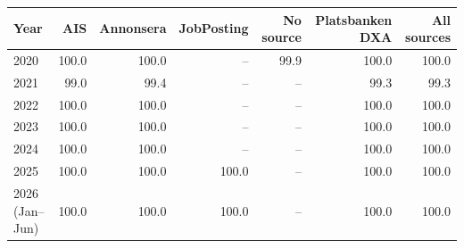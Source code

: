 \scriptsize
\setlength{\tabcolsep}{3.5pt}
\begin{tabular}{lrrrrrr}
\hline\hline
Year & AIS & Annonsera & JobPosting & No source & Platsbanken DXA & All sources \\
\hline
2020 & 100.0 & 100.0 & -- & 99.9 & 100.0 & 100.0 \\
2021 & 99.0 & 99.4 & -- & -- & 99.3 & 99.3 \\
2022 & 100.0 & 100.0 & -- & -- & 100.0 & 100.0 \\
2023 & 100.0 & 100.0 & -- & -- & 100.0 & 100.0 \\
2024 & 100.0 & 100.0 & -- & -- & 100.0 & 100.0 \\
2025 & 100.0 & 100.0 & 100.0 & -- & 100.0 & 100.0 \\
2026 (Jan--Jun) & 100.0 & 100.0 & 100.0 & -- & 100.0 & 100.0 \\
\hline\hline
\end{tabular}